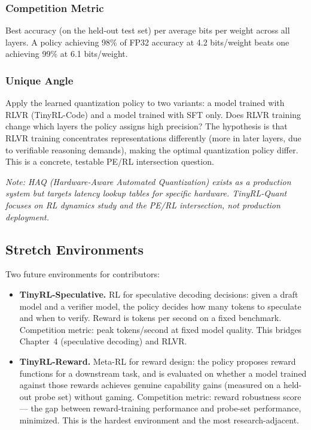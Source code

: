 \subsubsection*{Competition Metric}

Best accuracy (on the held-out test set) per average bits per weight across all layers. A policy achieving 98\% of FP32 accuracy at 4.2 bits/weight beats one achieving 99\% at 6.1 bits/weight.

\subsubsection*{Unique Angle}

Apply the learned quantization policy to two variants: a model trained with RLVR (TinyRL-Code) and a model trained with SFT only. Does RLVR training change which layers the policy assigns high precision? The hypothesis is that RLVR training concentrates representations differently (more in later layers, due to verifiable reasoning demands), making the optimal quantization policy differ. This is a concrete, testable PE/RL intersection question.

\textit{Note: HAQ (Hardware-Aware Automated Quantization) exists as a production system but targets latency lookup tables for specific hardware. TinyRL-Quant focuses on RL dynamics study and the PE/RL intersection, not production deployment.}

\subsection{Stretch Environments}

Two future environments for contributors:

\begin{itemize}
  \item \textbf{TinyRL-Speculative.} RL for speculative decoding decisions: given a draft model and a verifier model, the policy decides how many tokens to speculate and when to verify. Reward is tokens per second on a fixed benchmark. Competition metric: peak tokens/second at fixed model quality. This bridges Chapter~4 (speculative decoding) and RLVR.

  \item \textbf{TinyRL-Reward.} Meta-RL for reward design: the policy proposes reward functions for a downstream task, and is evaluated on whether a model trained against those rewards achieves genuine capability gains (measured on a held-out probe set) without gaming. Competition metric: reward robustness score --- the gap between reward-training performance and probe-set performance, minimized. This is the hardest environment and the most research-adjacent.
\end{itemize}

